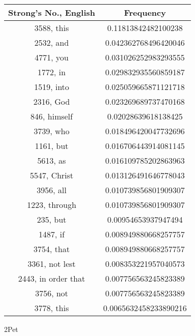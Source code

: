 \documentclass[12pt,letterpaper]{article}
\begin{document}
 \begin{longtable}{|c|c|}
\hline
 Strong's No., English & Frequency \\ \hline  
3588, this & 0.11813842482100238\\ \hline 
 2532, and & 0.042362768496420046\\ \hline 
 4771, you & 0.031026252983293555\\ \hline 
 1772, in & 0.029832935560859187\\ \hline 
 1519, into & 0.025059665871121718\\ \hline 
 2316, God & 0.023269689737470168\\ \hline 
 846, himself & 0.02028639618138425\\ \hline 
 3739, who & 0.018496420047732696\\ \hline 
 1161, but & 0.016706443914081145\\ \hline 
 5613, as & 0.016109785202863963\\ \hline 
 5547, Christ & 0.013126491646778043\\ \hline 
 3956, all & 0.010739856801909307\\ \hline 
 1223, through & 0.010739856801909307\\ \hline 
 235, but & 0.00954653937947494\\ \hline 
 1487, if & 0.008949880668257757\\ \hline 
 3754, that & 0.008949880668257757\\ \hline 
 3361, not lest & 0.008353221957040573\\ \hline 
 2443, in order that & 0.007756563245823389\\ \hline 
 3756, not & 0.007756563245823389\\ \hline 
 3778, this & 0.0065632458233890216\\ \hline 
\end{longtable} 
 

2Pet
\end{document}
